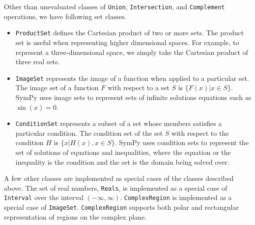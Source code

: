 
Other than unevaluated classes of \texttt{Union}, \texttt{Intersection}, and
\texttt{Complement} operations, we have following set classes.

\begin{itemize}

    \item \verb|ProductSet| defines the Cartesian product of two
        or more sets. The product set is useful when representing higher
        dimensional spaces. For example, to represent a three-dimensional space,
        we simply take the Cartesian product of three real sets.

      \item \verb|ImageSet| represents the image of a function when applied to
        a particular set. The image set of a function $F$ with respect to a set
        $S$ is $\{ F(x) | x \in S \}$. SymPy uses image sets to represent sets
        of infinite solutions equations such as $\sin(x)=0$.


      \item \verb|ConditionSet| represents a subset of a set whose members
        satisfies a particular condition. The condition set of the set $S$ with
        respect to the condition $H$ is $\{x | H(x), x \in S \}$. SymPy uses
        condition sets to represent the set of solutions of equations and
        inequalities, where the equation or the inequality is the condition and
        the set is the domain being solved
        over.


\end{itemize}

A few other classes are implemented as special cases of the classes described
above. The set of real numbers, \verb|Reals|, is implemented as a special case
of \verb|Interval| over the interval $(-\infty, \infty)$. \verb|ComplexRegion|
is implemented as a special case of \verb|ImageSet|. \verb|ComplexRegion|
supports both polar and rectangular representation of regions on the complex
plane.
